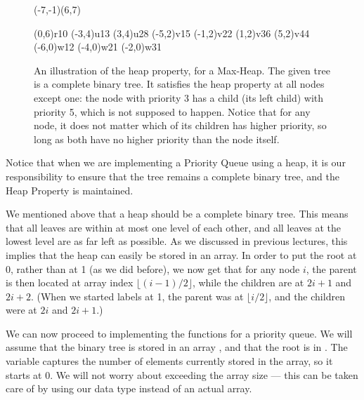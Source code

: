 \begin{figure}[htb]
\begin{center}
\pspicture(-7,-1)(6,7)


\cnodeput(0,6){r}{10}
\cnodeput(-3,4){u1}{3}
\cnodeput(3,4){u2}{8}
\cnodeput(-5,2){v1}{5}
\cnodeput(-1,2){v2}{2}
\cnodeput(1,2){v3}{6}
\cnodeput(5,2){v4}{4}
\cnodeput(-6,0){w1}{2}
\cnodeput(-4,0){w2}{1}
\cnodeput(-2,0){w3}{1}

\endpspicture
\end{center}
\caption{An illustration of the heap property, for a Max-Heap.
The given tree is a complete binary tree. It satisfies the heap
property at all nodes except one: the node with priority 3 has a child
(its left child) with priority 5, which is not supposed to happen.
Notice that for any node, it does not matter which of its children has
higher priority, so long as both have no higher priority than the node
itself.\label{fig:heap}}
\end{figure}

Notice that when we are implementing a Priority Queue using a heap, it
is our responsibility to ensure that the tree remains a complete
binary tree, and the Heap Property is maintained.

We mentioned above that a heap should be a complete binary tree. This
means that all leaves are within at most one level of each other, and
all leaves at the lowest level are as far left as possible.
As we discussed in previous lectures, this implies that the heap can
easily be stored in an array.
In order to put the root at 0, rather than at 1 (as we did before), we
now get that for any node $i$, the parent is then located at array index 
$\lfloor (i-1)/2 \rfloor$, while the children are at $2i+1$ and $2i+2$.
(When we started labels at 1, the parent was at 
$\lfloor i/2 \rfloor$, and the children were at $2i$ and $2i+1$.)

We can now proceed to implementing the functions for a priority queue.
We will assume that the binary tree is stored in an array ,
and that the root is in . 
The variable  captures the number of
elements currently stored in the array, so it starts at 0.
We will not worry about exceeding the array size --- this can be taken
care of by using our  data type instead of an actual array.

